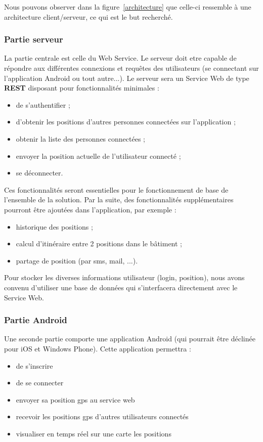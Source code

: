 Nous pouvons observer dans la figure~\ref{architecture} que celle-ci ressemble à une architecture client/serveur, ce qui est le but recherché.

\subsubsection{Partie serveur}
La partie centrale est celle du Web Service. Le serveur doit etre capable de répondre aux différentes connexions et requêtes des utilisateurs (se connectant sur l'application Android ou tout autre...). Le serveur sera un Service Web de type \textbf{REST} disposant pour fonctionnalités minimales :
\begin{itemize}
    \item de s'authentifier ;
    \item d'obtenir les positions d'autres personnes connectées sur l'application ;
    \item obtenir la liste des personnes connectées ;
    \item envoyer la position actuelle de l'utilisateur connecté ;
    \item se déconnecter.
\end{itemize}

Ces fonctionnalités seront essentielles pour le fonctionnement de base de l'ensemble de la solution. Par la suite, des fonctionnalités supplémentaires pourront être ajoutées dans l'application, par exemple :
\begin{itemize}
    \item historique des positions ;
    \item calcul d'itinéraire entre 2 positions dans le bâtiment ;
    \item partage de position (par sms, mail, ...).
\end{itemize}

Pour stocker les diverses informations utilisateur (login, position), nous avons convenu d'utiliser une base de données qui s'interfacera directement avec le Service Web.

\subsubsection{Partie Android}
Une seconde partie comporte une application Android (qui pourrait être déclinée pour iOS et Windows Phone). Cette application permettra :
\begin{itemize}
    \item de s'inscrire
    \item de se connecter
    \item envoyer sa position gps au service web
    \item recevoir les positions gps d'autres utilisateurs connectés
    \item visualiser en temps réel sur une carte les positions
\end{itemize}

